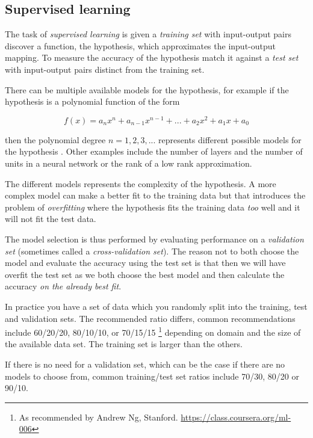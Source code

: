 
\subsection{Supervised learning}\label{sec:background:theory:suplearn}

The task of \textit{supervised learning} is given a \textit{training set} with input-output pairs discover a function, the hypothesis, which approximates the input-output mapping.  To measure the accuracy of the hypothesis match it against a \textit{test set} with input-output pairs distinct from the training set.
\citep{norvigAI}

There can be multiple available models for the hypothesis, for example if the hypothesis is a polynomial function of the form 

\begin{equation}
f(x) = a_n x^n + a_{n - 1} x^{n - 1} + ... + a_2 x^2 + a_1 x + a_0
\end{equation}

then the polynomial degree $n = 1, 2, 3, ...$ represents different possible models for the hypothesis \citep{norvigAI}. Other examples include the number of layers and the number of units in a neural network or the rank of a low rank approximation.

The different models represents the complexity of the hypothesis. A more complex model can make a better fit to the training data but that introduces the problem of \textit{overfitting} where the hypothesis fits the training data \textit{too} well and it will not fit the test data.
\citep{norvigAI}

The model selection is thus performed by evaluating performance on a \textit{validation set} (sometimes called a \textit{cross-validation set}). The reason not to both choose the model and evaluate the accuracy using the test set is that then we will have overfit the test set as we both choose the best model and then calculate the accuracy \textit{on the already best fit}.
\citep{norvigAI}

In practice you have a set of data which you randomly split into the training, test and validation sets. The recommended ratio differs, common recommendations include 60/20/20, 80/10/10, or 70/15/15 \footnote{As recommended by Andrew Ng, Stanford. \url{https://class.coursera.org/ml-006}} depending on domain and the size of the available data set. The training set is larger than the others.

If there is no need for a validation set, which can be the case if there are no models to choose from, common training/test set ratios include 70/30, 80/20 \cite{hu2008collaborative} or 90/10.


